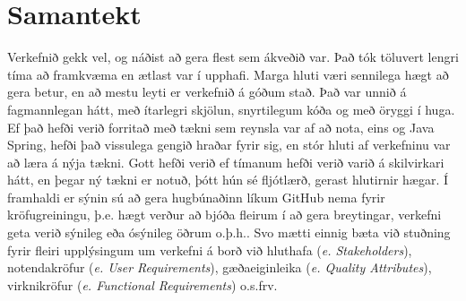 \documentclass[a4paper,11pt]{article}\usepackage[pdftex]{graphicx}\usepackage[]{xcolor}
\begin{document}
\section{Samantekt}
Verkefnið gekk vel, og náðist að gera flest sem ákveðið var. Það tók töluvert lengri tíma að framkvæma en ætlast var í upphafi. Marga hluti væri sennilega hægt að gera betur, en að mestu leyti er verkefnið á góðum stað. Það var unnið á fagmannlegan hátt, með ítarlegri skjölun, snyrtilegum kóða og með öryggi í huga. Ef það hefði verið forritað með tækni sem reynsla var af að nota, eins og Java Spring, hefði það vissulega gengið hraðar fyrir sig, en stór hluti af verkefninu var að læra á nýja tækni. Gott hefði verið ef tímanum hefði verið varið á skilvirkari hátt, en þegar ný tækni er notuð, þótt hún sé fljótlærð, gerast hlutirnir hægar.
\newline
Í framhaldi er sýnin sú að gera hugbúnaðinn líkum GitHub nema fyrir kröfugreiningu, þ.e. hægt verður að bjóða fleirum í að gera breytingar, verkefni geta verið sýnileg eða ósýnileg öðrum o.þ.h.. Svo mætti einnig bæta við stuðning fyrir fleiri upplýsingum um verkefni á borð við hluthafa (\textit{e. Stakeholders}), notendakröfur (\textit{e. User Requirements}), gæðaeiginleika (\textit{e. Quality Attributes}), virknikröfur (\textit{e. Functional Requirements}) o.s.frv.
\end{document}
